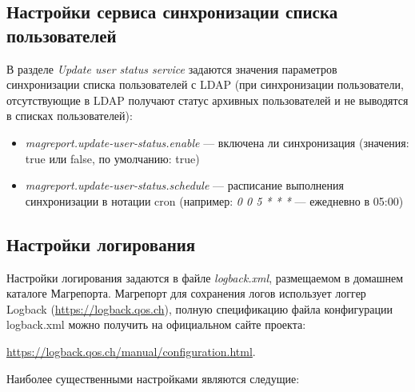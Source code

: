 \documentclass[../user-manual.tex]{subfiles}
\begin{document}
	\subsection{Настройки сервиса синхронизации списка пользователей}
	
	В разделе \textit{Update user status service} задаются значения параметров синхронизации списка пользователей с LDAP (при синхронизации пользователи, отсутствующие в LDAP получают статус архивных пользователей и не выводятся в списках пользователей):
	
	\begin{itemize}
		\item \textit{magreport.update-user-status.enable} --- включена ли синхронизация (значения: true или false, по умолчанию: true)
		
		\item \textit{magreport.update-user-status.schedule} --- расписание выполнения синхронизации в нотации cron (например: \textit{0 0 5 * * *} --- ежедневно в 05:00)
	\end{itemize}

	\subsection{Настройки логирования}\label{subsection:logging}
	
	Настройки логирования задаются в файле \textit{logback.xml}, размещаемом в домашнем каталоге Магрепорта. Магрепорт для сохранения логов использует логгер Logback (\href{https://logback.qos.ch}{https://logback.qos.ch}), полную спецификацию файла конфигурации logback.xml можно получить на официальном сайте проекта:
	\begin{center}
	\href{https://logback.qos.ch/manual/configuration.html}{https://logback.qos.ch/manual/configuration.html}.	\end{center}
	
	Наиболее существенными настройками являются следущие:
	
\end{document}
